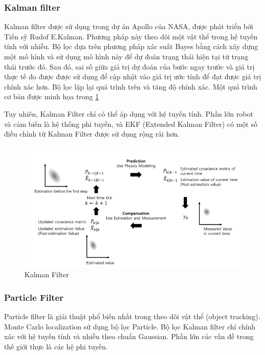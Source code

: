 {\subsubsection*{Kalman filter}
Kalman filter được sử dụng trong dự án Apollo của NASA, được phát triển bởi Tiến sỹ Rudof E.Kalman. Phương pháp này theo dõi một vật thể trong hệ tuyến tính với nhiễu. Bộ lọc dựa trên phương pháp xác suất Bayes bằng cách xây dựng một mô hình và sử dụng mô hình này để dự đoán trạng thái hiện tại từ trạng thái trước đó. Sau đó, sai số giữa giá trị dự đoán của bước ngay trước và giá trị thực tế đo được được sử dụng để cập nhật vào giá trị ước tính để đạt được giá trị chính xác hơn. Bộ lọc lặp lại quá trình trên và tăng độ chính xác. Một quá trình cơ bản được minh họa trong \figurename{\ref{fig:BasicConceptKalmanFilter}}

Tuy nhiên, Kalman Filter chỉ có thể áp dụng với hệ tuyến tính. Phần lớn robot và cảm biến là hệ thống phi tuyến, và EKF (Extended Kalman Filter) có một số điều chỉnh từ Kalman Filter được sử dụng rộng rãi hơn.


\begin{figure}[htbp]
  \centering
  \includegraphics[width=\linewidth]{figures/BasicConceptKalmanFilter.png}
  \caption{Kalman Filter\cite{pyo2017ros}}
  \label{fig:BasicConceptKalmanFilter}
\end{figure}

\subsubsection*{Particle Filter}
Particle filter là giải thuật phổ biến nhất trong theo dõi vật thể (object tracking). Monte Carlo localization sử dụng bộ lọc Particle. Bộ lọc Kalman filter chỉ chính xác với hệ tuyến tính và nhiễu theo chuẩn Gaussian. Phần lớn các vấn đề trong thế giới thực là các hệ phi tuyến.

}
